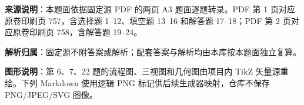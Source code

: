 


\begin{gknotice}
\textbf{来源说明}：本题面依据固定源 PDF 的两页 A3 题面逐题转录。PDF 第 1 页对应原卷印刷页 757，含选择题 1–12、填空题 13–16 和解答题 17–18；PDF 第 2 页对应原卷印刷页 758，含解答题 19–24。

\textbf{解析归属}：固定源不附答案或解析；配套答案与解析均由本库按本题面独立复算。

\textbf{图形说明}：第 6、7、22 题的流程图、三视图和几何图由项目内 TikZ 矢量源重绘。下列 Markdown 使用逻辑 PNG 标记供后续生成器映射，仓库不保存 PNG/JPEG/SVG 图像。
\end{gknotice}


